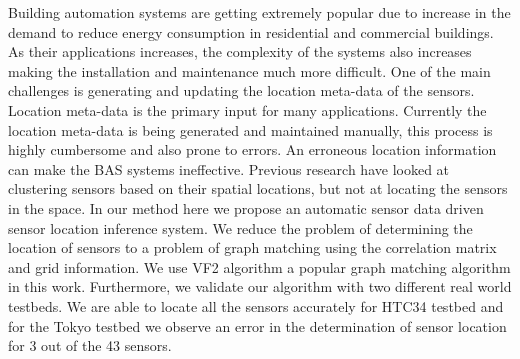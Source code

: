 Building automation systems are getting extremely popular due to increase in the demand to reduce energy consumption in residential and commercial  buildings. 
As their applications increases, the complexity of the systems also increases making the installation and maintenance much more difficult. One of the main challenges is generating and updating the location meta-data of the sensors. Location meta-data is the primary input for many applications. Currently the location meta-data is being generated and maintained manually, this process is highly cumbersome and also prone to errors. An erroneous location information can make the BAS systems ineffective. Previous research have looked at clustering sensors based on their spatial locations, but not at locating the sensors in the space. In our method here we propose an automatic sensor data driven sensor location inference system. We reduce the problem of determining the location of sensors to a problem of graph matching using the correlation matrix and grid information. We use VF2 algorithm a popular graph matching algorithm in this work. Furthermore, we validate our algorithm with two different real world testbeds. We are able to locate all the sensors accurately for HTC34 testbed and for the Tokyo testbed we observe an error in the determination of sensor location for 3 out of the 43 sensors.

